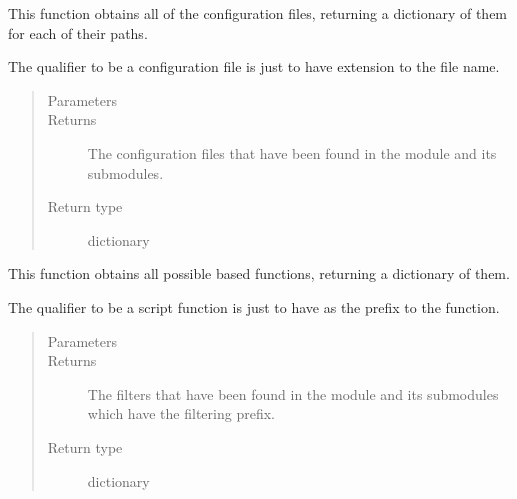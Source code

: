 \documentclass[letterpaper,10pt,english]{sphinxmanual}
\begin{document}

\begin{fulllineitems}
\label{\detokenize{docstrings/ifa_smeargle.runtime:ifa_smeargle.runtime.get_configuration_files}}
This function obtains all of the configuration files,
returning a dictionary of them for each of their paths.

The qualifier to be a configuration file is just to have 
extension to the file name.
\begin{quote}\begin{description}
\item[{Parameters}] \leavevmode
{} \textendash{} 

\item[{Returns}] \leavevmode
{} \textendash{} The configuration files that have been found in the module
and its sub\sphinxhyphen{}modules.

\item[{Return type}] \leavevmode
dictionary

\end{description}\end{quote}

\end{fulllineitems}


\begin{fulllineitems}
\label{\detokenize{docstrings/ifa_smeargle.runtime:ifa_smeargle.runtime.get_filter_functions}}
This function obtains all possible  based
functions, returning a dictionary of them.

The qualifier to be a script function is just to have 
as the prefix to the function.
\begin{quote}\begin{description}
\item[{Parameters}] \leavevmode
{} \textendash{} 

\item[{Returns}] \leavevmode
{} \textendash{} The filters that have been found in the module and its
sub\sphinxhyphen{}modules which have the filtering prefix.

\item[{Return type}] \leavevmode
dictionary

\end{description}\end{quote}

\end{fulllineitems}
\end{document}
